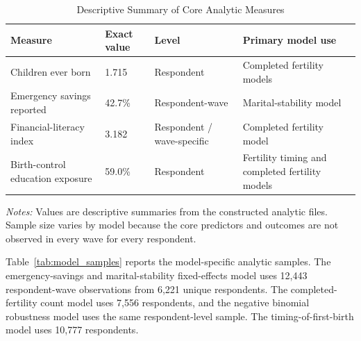 \documentclass[12pt]{article}
\begin{document}
\begin{table}[!htbp]
\centering
\caption{Descriptive Summary of Core Analytic Measures}
\label{tab:descriptive_summary}
\small
\begin{adjustbox}{max width=\textwidth}
\begin{tabularx}{\textwidth}{Y p{0.18\textwidth} p{0.20\textwidth} Y}
\toprule
\textbf{Measure} & \textbf{Exact value} & \textbf{Level} & \textbf{Primary model use} \\
\midrule
Children ever born & 1.715 & Respondent & Completed fertility models \\
Emergency savings reported & 42.7\% & Respondent-wave & Marital-stability model \\
Financial-literacy index & 3.182 & Respondent / wave-specific & Completed fertility model \\
Birth-control education exposure & 59.0\% & Respondent & Fertility timing and completed fertility models \\
\bottomrule
\end{tabularx}
\end{adjustbox}
\begin{minipage}{0.95\textwidth}
\footnotesize
\textit{Notes:} Values are descriptive summaries from the constructed analytic files. Sample size varies by model because the core predictors and outcomes are not observed in every wave for every respondent.
\end{minipage}
\end{table}

Table~\ref{tab:model_samples} reports the model-specific analytic samples. The emergency-savings and marital-stability fixed-effects model uses 12,443 respondent-wave observations from 6,221 unique respondents. The completed-fertility count model uses 7,556 respondents, and the negative binomial robustness model uses the same respondent-level sample. The timing-of-first-birth model uses 10,777 respondents.
\end{document}
